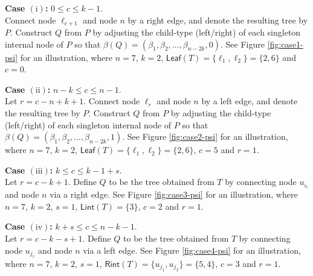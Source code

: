 \documentclass[12pt]{article}
\numberwithin{equation}{section}
\theoremstyle{plain}
\def\Lint{\mathsf{Lint}}
\def\Leaf{\mathsf{Leaf}}
\def\Rint{\mathsf{Rint}}
\begin{document}
	 	\noindent \textbf{Case $\mathrm{(i)}$:} $0\le c\le k-1$.\\
	 	Connect node $\ell_{c+1}$ and node $n$ by a right edge, and denote the resulting tree by $P$.
	 	Construct $Q$ from $P$ by adjusting   the child-type (left/right)   of each singleton internal node of $P$ so that $\beta(Q)=(\beta_1, \beta_2, \ldots, \beta_{n-2k}, 0)$.  See Figure \ref{fig:case1-psi} for an illustration,  where $n=7$, $k=2$, $\Leaf(T)=\{\ell_1, \ell_2\}=\{2,6\}$ and $c=0$. 
	 
	 	
	 	\noindent \textbf{Case $\mathrm{(ii)}$:} $n-k\le c\le n-1$.\\
	 	Let $r=c-n+k+1$.
	 	Connect node $\ell_{r}$ and node $n$ by a left edge, and denote the resulting tree by $P$.
	 Construct $Q$ from $P$ by adjusting the child-type (left/right)   of each singleton internal node of $P$ so that $\beta(Q)=(\beta_1, \beta_2, \ldots, \beta_{n-2k}, 1)$. See Figure \ref{fig:case2-psi} for an illustration,  where $n=7$, $k=2$,  $\Leaf(T)=\{\ell_1, \ell_2\}=\{2,6\}$, $c=5$ and $r=1$. 
	 
	 	
	 	\noindent \textbf{Case $\mathrm{(iii)}$:} $k\le c\le k-1+s$.\\
	 	Let $r=c-k+1$. Define $Q$ to be the tree obtained from $T$ by connecting node $u_{i_{r}}$ and node $n$ via a right edge.  See Figure \ref{fig:case3-psi} for an illustration,  where $n=7$, $k=2$, $s=1$,  $\Lint(T)=\{ 3\}$, $c=2$ and $r=1$. 
	 	
	 	\noindent \textbf{Case $\mathrm{(iv)}$:} $k+s\le c\le n-k-1$.\\
	 	Let $r=c-k-s+1$. Define $Q$ to be the tree obtained from $T$ by connecting node $u_{j_{r}}$ and node $n$ via a left edge.  See Figure \ref{fig:case4-psi} for an illustration,  where $n=7$, $k=2$, $s=1$,  $\Rint(T)=\{ u_{j_1}, u_{j_2}\}=\{5,4\}$, $c=3$ and $r=1$. 
	 
	 	
	 	
\end{document}
